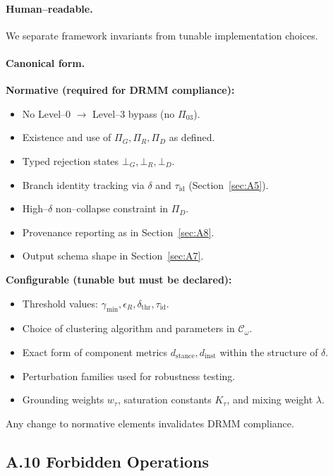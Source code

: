 \documentclass[11pt, a4paper]{article}
\begin{document}
\paragraph{Human–readable.}
We separate framework invariants from tunable implementation choices.

\paragraph{Canonical form.}

\textbf{Normative (required for DRMM compliance):}
\begin{itemize}
  \item No Level–0 $\to$ Level–3 bypass (no $\Pi_{03}$).
  \item Existence and use of $\Pi_G, \Pi_R, \Pi_D$ as defined.
  \item Typed rejection states $\bot_G, \bot_R, \bot_D$.
  \item Branch identity tracking via $\delta$ and $\tau_{\mathrm{id}}$ (Section~\ref{sec:A5}).
  \item High–$\delta$ non–collapse constraint in $\Pi_D$.
  \item Provenance reporting as in Section~\ref{sec:A8}.
  \item Output schema shape in Section~\ref{sec:A7}.
\end{itemize}

\textbf{Configurable (tunable but must be declared):}
\begin{itemize}
  \item Threshold values: $\gamma_{\min}, \epsilon_R, \delta_{\mathrm{thr}}, \tau_{\mathrm{id}}$.
  \item Choice of clustering algorithm and parameters in $\mathcal{C}_\omega$.
  \item Exact form of component metrics $d_{\mathrm{stance}}, d_{\mathrm{inst}}$ within the structure of $\delta$.
  \item Perturbation families used for robustness testing.
  \item Grounding weights $w_\tau$, saturation constants $K_\tau$, and mixing weight $\lambda$.
\end{itemize}

Any change to normative elements invalidates DRMM compliance.

\subsection*{A.10 \quad Forbidden Operations}
\end{document}
